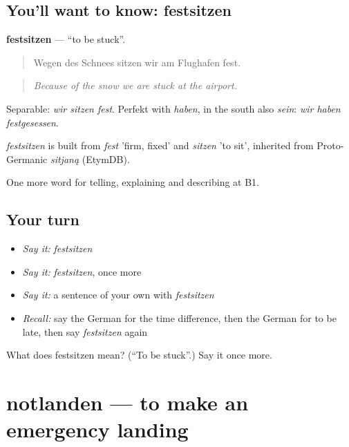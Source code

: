\subsection*{You'll want to know: festsitzen}
\textbf{festsitzen} — \textquotedblleft{}to be stuck\textquotedblright{}.

\begin{quote}
Wegen des Schnees sitzen wir am Flughafen fest.
\end{quote}

\begin{quote}
\emph{Because of the snow we are stuck at the airport.}
\end{quote}

Separable: \emph{wir sitzen fest}. Perfekt with \emph{haben}, in the south also \emph{sein}: \emph{wir haben festgesessen}.

\begin{cousinweb}
\emph{festsitzen} is built from \emph{fest} 'firm, fixed' and \emph{sitzen} 'to sit', inherited from Proto-Germanic \emph{sitjaną} (EtymDB).
\end{cousinweb}

\begin{grammarlens}[title={What you've built}]
One more word for telling, explaining and describing at B1.
\end{grammarlens}

\subsection*{Your turn}
\begin{itemize}
\raggedright
  \item \emph{Say it:} \emph{festsitzen}
  \item \emph{Say it:} \emph{festsitzen}, once more
  \item \emph{Say it:} a sentence of your own with \emph{festsitzen}
  \item \emph{Recall:} say the German for the time difference, then the German for to be late, then say \emph{festsitzen} again
\end{itemize}

\begin{tcolorbox}[breakable,colback=teal!4,colframe=teal!35!black,title={Before you move on}]
What does festsitzen mean? (\textquotedblleft{}To be stuck\textquotedblright{}.) Say it once more.
\end{tcolorbox}
\section[notlanden]{notlanden — to make an emergency landing}

